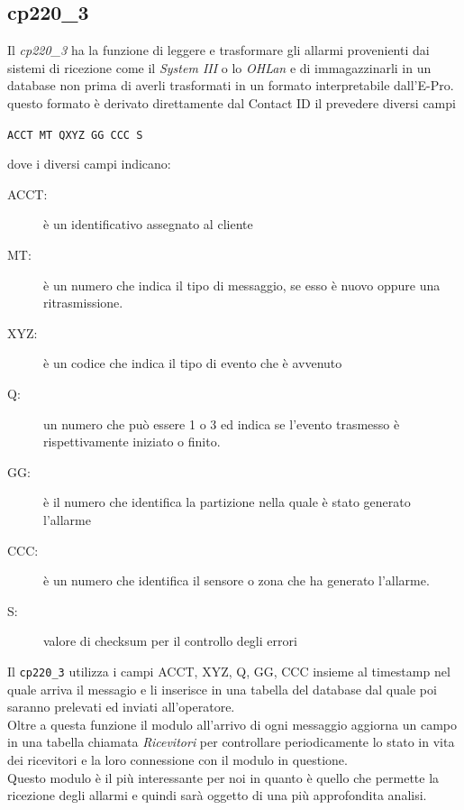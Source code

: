 \subsection{cp220\_3}
Il \emph{cp220\_3} ha la funzione di leggere e trasformare gli allarmi provenienti dai sistemi di ricezione come il \emph{System III} o lo \emph{OHLan} e di immagazzinarli in un database non prima di averli trasformati in un formato interpretabile dall'E-Pro. questo formato è derivato direttamente dal Contact ID il prevedere diversi campi
\begin{center}
	\texttt{ACCT MT QXYZ GG CCC S}
\end{center}
dove i diversi campi indicano:
\begin{description}
	\item[ACCT:] è un identificativo assegnato al cliente
	\item[MT:] è un numero che indica il tipo di messaggio, se esso è nuovo oppure una ritrasmissione.
	\item[XYZ:] è un codice che indica il tipo di evento che è avvenuto
	\item[Q:] un numero che può essere 1 o 3 ed indica se l'evento trasmesso è rispettivamente iniziato o finito.
	\item[GG:] è il numero che identifica la partizione nella quale è stato generato l'allarme
	\item[CCC:] è un numero che identifica il sensore o zona che ha generato l'allarme.
	\item[S:] valore di checksum per il controllo degli errori
\end{description}
Il \texttt{cp220\_3} utilizza i campi ACCT, XYZ, Q, GG, CCC insieme al timestamp nel quale arriva il messagio e li inserisce in una tabella del database dal quale poi saranno prelevati ed inviati all'operatore.\\
Oltre a questa funzione il modulo all'arrivo di ogni messaggio aggiorna un campo in una tabella chiamata \emph{Ricevitori} per controllare periodicamente lo stato in vita dei ricevitori e la loro connessione con il modulo in questione.\\
Questo modulo è il più interessante per noi in quanto è quello che permette la ricezione degli allarmi e quindi sarà oggetto di una più approfondita analisi.
